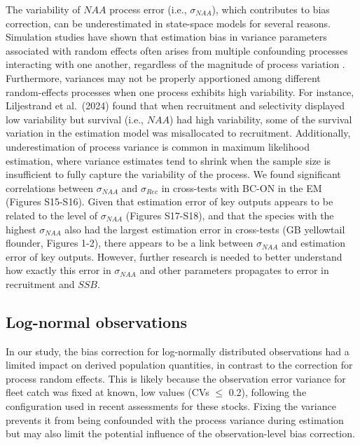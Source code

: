 \documentclass[
  12pt,
]{article}
\begin{document}
The variability of \(NAA\) process error (i.e., \(\sigma_{NAA}\)), which
contributes to bias correction, can be underestimated in state-space
models for several reasons. Simulation studies have shown that
estimation bias in variance parameters associated with random effects
often arises from multiple confounding processes interacting with one
another, regardless of the magnitude of process variation
\citep{Li2024,Liljestrand2024}. Furthermore, variances may not be
properly apportioned among different random-effects processes when one
process exhibits high variability. For instance, Liljestrand et
al.~(2024) found that when recruitment and selectivity displayed low
variability but survival (i.e., \(NAA\)) had high variability, some of
the survival variation in the estimation model was misallocated to
recruitment. Additionally, underestimation of process variance is common
in maximum likelihood estimation, where variance estimates tend to
shrink when the sample size is insufficient to fully capture the
variability of the process. We found significant correlations between
\(\sigma_{NAA}\) and \(\sigma_{Rec}\) in cross-tests with BC-ON in the
EM (Figures S15-S16). Given that estimation error of key outputs appears
to be related to the level of \(\sigma_{NAA}\) (Figures S17-S18), and
that the species with the highest \(\sigma_{NAA}\) also had the largest
estimation error in cross-tests (GB yellowtail flounder, Figures 1-2),
there appears to be a link between \(\sigma_{NAA}\) and estimation error
of key outputs. However, further research is needed to better understand
how exactly this error in \(\sigma_{NAA}\) and other parameters
propagates to error in recruitment and \(SSB\).

\hypertarget{log-normal-observations}{%
\subsection{Log-normal observations}\label{log-normal-observations}}

In our study, the bias correction for log-normally distributed
observations had a limited impact on derived population quantities, in
contrast to the correction for process random effects. This is likely
because the observation error variance for fleet catch was fixed at
known, low values (CVs \(\le\) 0.2), following the configuration used in
recent assessments for these stocks. Fixing the variance prevents it
from being confounded with the process variance during estimation but
may also limit the potential influence of the observation-level bias
correction.
\end{document}
